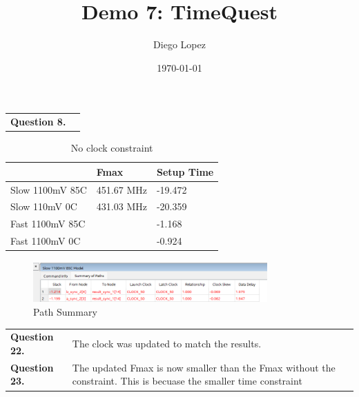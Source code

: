 \documentclass{article}
\title{Demo 7: TimeQuest}
\author{Diego Lopez}
\date{\today}
\begin{document}
\maketitle

\begin{table}[h!]
    \begin{tabular}{ll}
        \textbf{Question 8.}
    \end{tabular}
\end{table}
\begin{table}[h!]
    \centering
    \begin{tabular}{|p{3cm}|p{3cm}|p{3cm}|}%
        \hline
         & Fmax & Setup Time \\ \hline
         Slow 1100mV 85C & 451.67 MHz & -19.472 \\ \hline %
         Slow 110mV 0C & 431.03 MHz & -20.359 \\ \hline
         Fast 1100mV 85C  & & -1.168 \\ \hline
         Fast 1100mV 0C & & -0.924 \\ \hline
    \end{tabular}
    \caption{No clock constraint}
\end{table}

\begin{figure}[htbp]
    \centering
    \includegraphics[width=0.8\textwidth]{PathSummary1.png}
    \caption{Path Summary}
    \label{fig:PathSummary1}
\end{figure}

\begin{table}[h!]
    \centering
    \begin{tabular}{ll}
        \textbf{Question 22.} & The clock was updated to match the results. \\
        \textbf{Question 23.} & The updated Fmax is now smaller than the Fmax without the constraint. This is becuase the smaller time constraint 
    \end{tabular}
\end{table}
\end{document}
